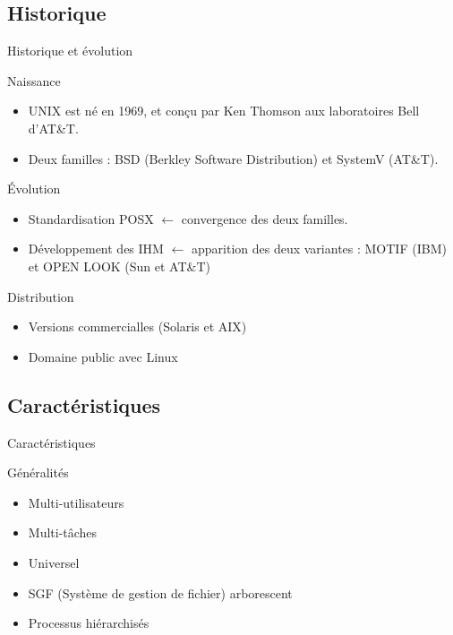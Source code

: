 \subsection{Historique}
\begin{frame}{Historique et évolution}
\begin{block}{Naissance}
\begin{itemize}
\item UNIX est né en 1969, et conçu par Ken Thomson aux laboratoires Bell d'AT\&T.
\item Deux familles : BSD (Berkley Software Distribution) et SystemV (AT\&T).
\end{itemize}

\end{block}

\begin{block}{Évolution}
\begin{itemize}
\item Standardisation POSX $\leftarrow$ convergence des deux familles.
\item Développement des IHM $\leftarrow$ apparition des deux variantes : MOTIF (IBM) et OPEN LOOK (Sun et AT\&T)
\end{itemize}

\end{block}

\begin{block}{Distribution}
\begin{itemize}
\item Versions commercialles (Solaris et AIX)
\item Domaine public avec Linux
\end{itemize}
\end{block}

\end{frame}

\subsection{Caractéristiques}
\begin{frame}{Caractéristiques}
\begin{block}{Généralités}
\begin{itemize}
\item Multi-utilisateurs
\item Multi-tâches
\item Universel
\item SGF (Système de gestion de fichier) arborescent
\item Processus hiérarchisés
\end{itemize}
\end{block}
\end{frame}


